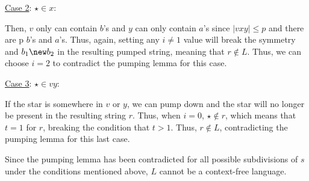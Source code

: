 \documentclass[11pt]{article}
\begin{document}
\begin{enumerate}
    \underline{Case 2}: $\star \in x$:

    Then, $v$ only can contain $b$'s and $y$ can only contain $a$'s since $|vxy| \leq p$ and there are p $b$'s and $a$'s. Thus, again, setting any $i \neq 1$ value will break the symmetry and $b_1 \new b_2$ in the resulting pumped string, meaning that $r \notin L$. Thus, we can choose $i=2$ to contradict the pumping lemma for this case. 

    \underline{Case 3}: $\star \in vy$:

    If the star is somewhere in $v$ or $y$, we can pump down and the star will no longer be present in the resulting string $r$. Thus, when $i=0$, $\star \notin r$, which means that $t=1$ for $r$, breaking the condition that $t > 1$. Thus, $r \notin L$, contradicting the pumping lemma for this last case.

    Since the pumping lemma has been contradicted for all possible subdivisions of $s$ under the conditions mentioned above, $L$ cannot be a context-free language.

    
\end{enumerate}
\end{document}
